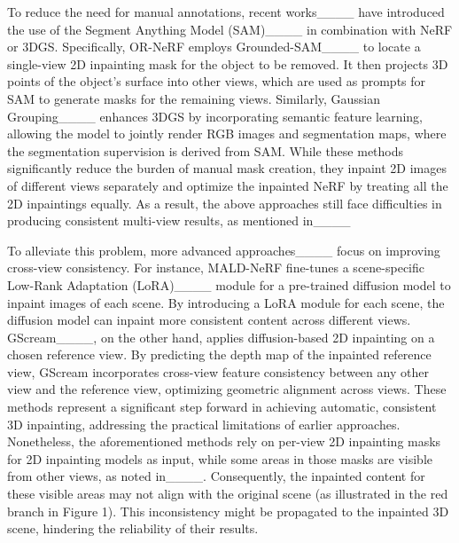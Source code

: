 To reduce the need for manual annotations, recent works____ have introduced the use of the Segment Anything Model (SAM)____ in combination with NeRF or 3DGS. Specifically, OR-NeRF employs Grounded-SAM____ to locate a single-view 2D inpainting mask for the object to be removed. It then projects 3D points of the object's surface into other views, which are used as prompts for SAM to generate masks for the remaining views. 
Similarly, Gaussian Grouping____ enhances 3DGS by incorporating semantic feature learning, allowing the model to jointly render RGB images and segmentation maps, where the segmentation supervision is derived from SAM. 
While these methods significantly reduce the burden of manual mask creation, they inpaint 2D images of different views separately and optimize the inpainted NeRF by treating all the 2D inpaintings equally. As a result, the above approaches still face difficulties in producing consistent multi-view results, as mentioned in____



To alleviate this problem, more advanced approaches____ focus on improving cross-view consistency. For instance, MALD-NeRF fine-tunes a scene-specific Low-Rank Adaptation (LoRA)____ module for a pre-trained diffusion model to inpaint images of each scene. By introducing a LoRA module for each scene, the diffusion model can inpaint more consistent content across different views. GScream____, on the other hand, applies diffusion-based 2D inpainting on a chosen reference view. By predicting the depth map of the inpainted reference view, GScream incorporates cross-view feature consistency between any other view and the reference view, optimizing geometric alignment across views. These methods represent a significant step forward in achieving automatic, consistent 3D inpainting, addressing the practical limitations of earlier approaches. Nonetheless, the aforementioned methods rely on per-view 2D inpainting masks for 2D inpainting models as input, while some areas in those masks are visible from other views, as noted in____. Consequently, the inpainted content for these visible areas may not align with the original scene (as illustrated in the red branch in Figure 1). This inconsistency might be propagated to the inpainted 3D scene, hindering the reliability of their results.